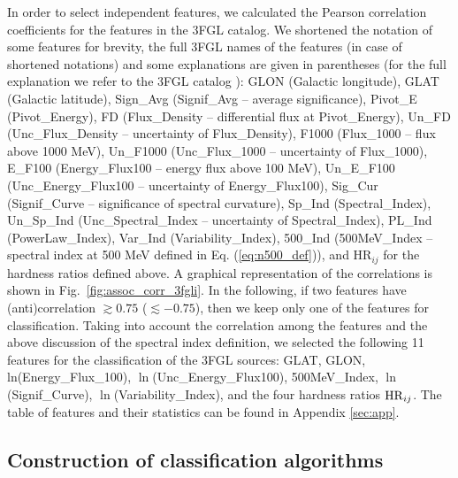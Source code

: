 \documentclass[referee]{aa} %
\begin{document}
In order to select independent features, we calculated the Pearson correlation coefficients for the features in the 3FGL catalog.
We shortened the notation of some features for brevity, the full 3FGL names of the features (in case of shortened notations) and some explanations are given in parentheses
(for the full explanation we refer to the 3FGL catalog \citep{2015ApJS..218...23A}):
GLON (Galactic longitude), 
GLAT (Galactic latitude),
Sign\_Avg (Signif\_Avg -- average significance), %
Pivot\_E (Pivot\_Energy), 
FD (Flux\_Density -- differential flux at Pivot\_Energy), 
Un\_FD (Unc\_Flux\_Density -- uncertainty of Flux\_Density), 
F1000 (Flux\_1000 -- flux above 1000 MeV), 
Un\_F1000 (Unc\_Flux\_1000 -- uncertainty of Flux\_1000),
E\_F100 (Energy\_Flux100 -- energy flux above 100 MeV),  
Un\_E\_F100 (Unc\_Energy\_Flux100 -- uncertainty of Energy\_Flux100), 
Sig\_Cur (Signif\_Curve -- significance of spectral curvature), 
Sp\_Ind (Spectral\_Index), 
Un\_Sp\_Ind (Unc\_Spectral\_Index -- uncertainty of Spectral\_Index),
PL\_Ind (PowerLaw\_Index), 
Var\_Ind (Variability\_Index), 
500\_Ind (500MeV\_Index -- spectral index at 500 MeV defined in Eq. (\ref{eq:n500_def})), 
and HR$_{ij}$ for the hardness ratios defined above.
A graphical representation of the correlations is shown in Fig.~\ref{fig:assoc_corr_3fgli}. 
In the following, if two features have (anti)correlation $\gtrsim 0.75$ 
($\lesssim -0.75$), then we keep only one of the features for classification.
Taking into account the correlation among the features and the above discussion of the spectral index definition,
we selected the following 11 features for the classification of the 3FGL sources:
GLAT, GLON, ln(Energy\_Flux\_100), $\ln$(Unc\_Energy\_Flux100), 500MeV\_Index, $\ln$(Signif\_Curve), 
$\ln$(Variability\_Index), and the four hardness ratios ${\rm HR}_{ij}$.  
The table of features and their statistics can be found in Appendix \ref{sec:app}.



\subsection{Construction of classification algorithms}
\end{document}
